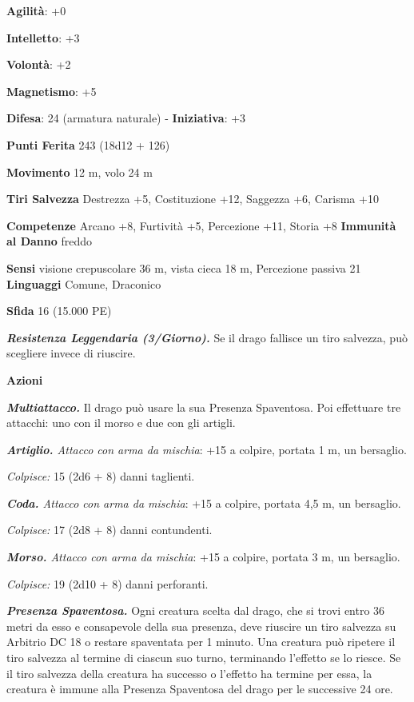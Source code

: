 \begin{multicols}{2}
\textbf{Agilità}: +0

\textbf{Intelletto}: +3

\textbf{Volontà}: +2

\textbf{Magnetismo}: +5

\textbf{Difesa}: 24 (armatura naturale) - \textbf{Iniziativa}: +3

\textbf{Punti Ferita} 243 (18d12 + 126)

\textbf{Movimento} 12 m, volo 24 m

\textbf{Tiri Salvezza} Destrezza +5, Costituzione +12, Saggezza +6,
Carisma +10

\textbf{Competenze} Arcano +8, Furtività +5, Percezione +11, Storia +8
\textbf{Immunità al Danno} freddo

\textbf{Sensi} visione crepuscolare 36 m, vista cieca 18 m, Percezione passiva
21 \textbf{Linguaggi} Comune, Draconico

\textbf{Sfida} 16 (15.000 PE)\smallskip

\emph{\textbf{Resistenza Leggendaria (3/Giorno).}} Se il drago fallisce
un tiro salvezza, può scegliere invece di riuscire.

\smallskip\textbf{Azioni}

\emph{\textbf{Multiattacco.}} Il drago può usare la sua Presenza
Spaventosa. Poi effettuare tre attacchi: uno con il morso e due con gli
artigli.

\emph{\textbf{Artiglio.} Attacco con arma da mischia}: +15 a colpire,
portata 1 m, un bersaglio.

\emph{Colpisce:} 15 (2d6 + 8) danni taglienti.

\emph{\textbf{Coda.} Attacco con arma da mischia}: +15 a colpire,
portata 4,5 m, un bersaglio.

\emph{Colpisce:} 17 (2d8 + 8) danni contundenti.

\emph{\textbf{Morso.} Attacco con arma da mischia}: +15 a colpire,
portata 3 m, un bersaglio.

\emph{Colpisce:} 19 (2d10 + 8) danni perforanti.

\emph{\textbf{Presenza Spaventosa.}} Ogni creatura scelta dal drago, che
si trovi entro 36 metri da esso e consapevole della sua presenza, deve
riuscire un tiro salvezza su Arbitrio DC 18 o restare spaventata per 1
minuto. Una creatura può ripetere il tiro salvezza al termine di ciascun
suo turno, terminando l'effetto se lo riesce. Se il tiro salvezza della
creatura ha successo o l'effetto ha termine per essa, la creatura è
immune alla Presenza Spaventosa del drago per le successive 24 ore.


\end{multicols}
